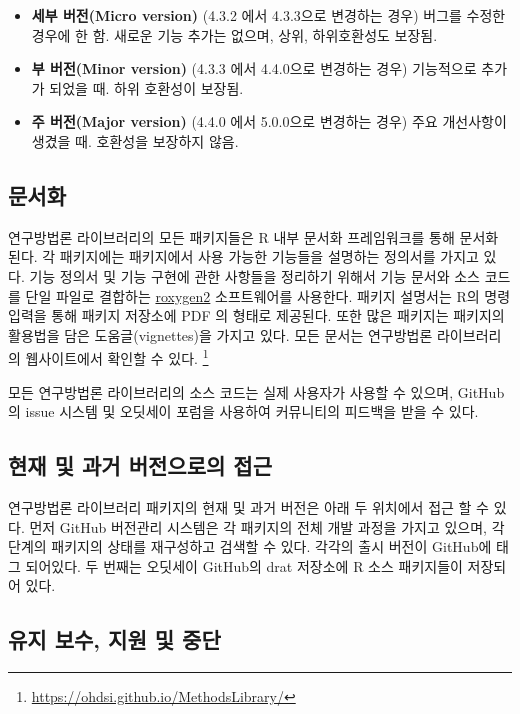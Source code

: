 \documentclass[11pt]{book}
\providecommand{\tightlist}{%
  \setlength{\itemsep}{0pt}\setlength{\parskip}{0pt}}
\let\rmarkdownfootnote\footnote%
\def\footnote{\protect\rmarkdownfootnote}
\theoremstyle{definition}
\theoremstyle{definition}
\theoremstyle{definition}
\theoremstyle{remark}
\begin{document}
\begin{itemize}
\tightlist
\item
  \textbf{세부 버전(Micro version)} (4.3.2 에서 4.3.3으로 변경하는 경우)
  버그를 수정한 경우에 한 함. 새로운 기능 추가는 없으며, 상위,
  하위호환성도 보장됨.
\item
  \textbf{부 버전(Minor version)} (4.3.3 에서 4.4.0으로 변경하는 경우)
  기능적으로 추가가 되었을 때. 하위 호환성이 보장됨.
\item
  \textbf{주 버전(Major version)} (4.4.0 에서 5.0.0으로 변경하는 경우)
  주요 개선사항이 생겼을 때. 호환성을 보장하지 않음.
\end{itemize}

\subsection{문서화}

연구방법론 라이브러리의 모든 패키지들은 R 내부 문서화 프레임워크를 통해
문서화 된다. 각 패키지에는 패키지에서 사용 가능한 기능들을 설명하는
정의서를 가지고 있다. 기능 정의서 및 기능 구현에 관한 사항들을 정리하기
위해서 기능 문서와 소스 코드를 단일 파일로 결합하는
\href{https://cran.r-project.org/web/packages/roxygen2/vignettes/roxygen2.html}{roxygen2}
소프트웨어를 사용한다. 패키지 설명서는 R의 명령 입력을 통해 패키지
저장소에 PDF 의 형태로 제공된다. 또한 많은 패키지는 패키지의 활용법을
담은 도움글(vignettes)을 가지고 있다. 모든 문서는 연구방법론
라이브러리의 웹사이트에서 확인할 수 있다. \footnote{\url{https://ohdsi.github.io/MethodsLibrary/}}

모든 연구방법론 라이브러리의 소스 코드는 실제 사용자가 사용할 수 있으며,
GitHub의 issue 시스템 및 오딧세이 포럼을 사용하여 커뮤니티의 피드백을
받을 수 있다.

\subsection{현재 및 과거 버전으로의 접근}\label{----}

연구방법론 라이브러리 패키지의 현재 및 과거 버전은 아래 두 위치에서 접근
할 수 있다. 먼저 GitHub 버전관리 시스템은 각 패키지의 전체 개발 과정을
가지고 있으며, 각 단계의 패키지의 상태를 재구성하고 검색할 수 있다.
각각의 출시 버전이 GitHub에 태그 되어있다. 두 번째는 오딧세이 GitHub의
drat 저장소에 R 소스 패키지들이 저장되어 있다.

\subsection{유지 보수, 지원 및 중단}\label{----}
\end{document}
